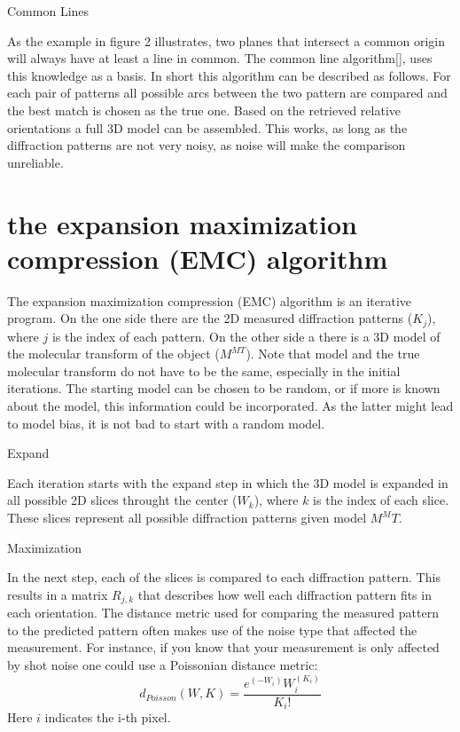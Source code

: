 Common Lines

As the example in figure 2 illustrates, two planes that intersect a common origin will always have at least a line in common. The common line algorithm[], uses this knowledge as a basis. In short this algorithm can be described as follows. For each pair of patterns all possible arcs between the two pattern are compared and the best match is chosen as the true one. Based on the retrieved relative orientations a full 3D model can be assembled. This works, as long as the diffraction patterns are not very noisy, as noise will make the comparison unreliable.

\section{the expansion maximization compression (EMC) algorithm}
The expansion maximization compression (EMC) algorithm is an iterative program. On the one side there are the 2D measured diffraction patterns ($K_j$), where $j$ is the index of each pattern. On the other side a there is a 3D model of the molecular transform of the object ($M^{MT}$). Note that model and the true molecular transform do not have to be the same, especially in the initial iterations. The starting model can be chosen to be random, or if more is known about the model, this information could be incorporated. As the latter might lead to model bias, it is not bad to start with a random model.

Expand 

Each iteration starts with the expand step in which the 3D model is expanded in all possible 2D slices throught the center ($W_k$), where $k$ is the index of each slice. These slices represent all possible diffraction patterns given model $M^MT$. 

Maximization 

In the next step, each of the slices is compared to each diffraction pattern. This results in a matrix $R_{j,k}$ that describes how well each diffraction pattern fits in each orientation. The distance metric used for comparing the measured pattern to the predicted pattern often makes use of the noise type that affected the measurement. For instance, if you know that your measurement is only affected by shot noise one could use a Poissonian distance metric:
\begin{equation}
d_{Poisson}(W,K) = \frac{e^(-W_i)W_i^(K_i)}{K_i !}
\end{equation}
Here $i$ indicates the i-th pixel.

